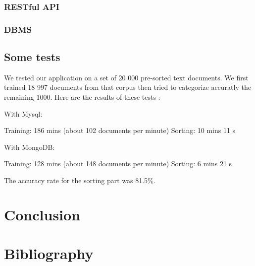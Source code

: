 \documentclass[a4paper,11pt]{article}
\begin{document}
\subsubsection{RESTful API}

\subsubsection{DBMS}


\subsection{Some tests}
    
We tested our application on a set of 20 000 pre-sorted text documents. We
first trained 18 997 documents from that corpus then tried to categorize
accuratly the remaining 1000. Here are the results of these tests :

With Mysql:

Training: 186 mins (about 102 documents per minute)
Sorting: 10 mins 11 s

With MongoDB:

Training: 128 mins (about 148 documents per minute)
Sorting: 6 mins 21 s

The accuracy rate for the sorting part was 81.5\%.

\section*{Conclusion}


\clearpage
\section*{Bibliography}
\end{document}
